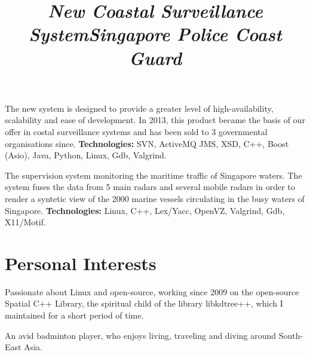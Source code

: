 \documentclass[overlapped,line,letterpaper]{res}
\begin{document}
\begin{resume}
  \title{\em New Coastal Surveillance System}
  \begin{position}
    The new system is designed to provide a greater level of high-availability,
    scalability and ease of development. In 2013, this product became the basis
    of our offer in costal surveillance systems and has been sold to 3
    governmental organisations since.
    \newline
    {\bf Technologies:} SVN, ActiveMQ JMS, XSD, C++, Boost (Asio), Java, Python, Linux,
    Gdb, Valgrind.
  \end{position}

  \title{\em Singapore Police Coast Guard}
  \begin{position}
    The supervision system monitoring the maritime traffic of
    Singapore waters. The system fuses the data from 5 main radars and
    several mobile radars in order to render a syntetic view of the 2000
    marine vessels circulating in the busy waters of Singapore.
    \newline
    {\bf Technologies:} Linux, C++, Lex/Yacc, OpenVZ, Valgrind, Gdb, X11/Motif.
  \end{position}



  \section{\bf Personal Interests}

  Passionate about Linux and open-source, working since 2009 on the
  open-source Spatial C++ Library, the spiritual child of the library
  libkdtree++, which I maintained for a short period of time.

  An avid badminton player, who enjoys living, traveling and diving around
  South-East Asia.



\end{resume}
\end{document}
